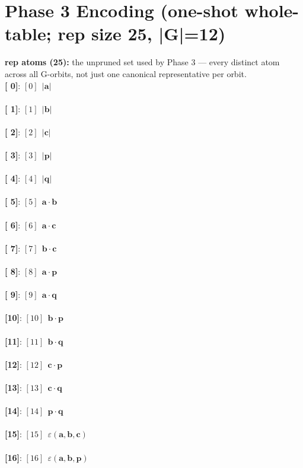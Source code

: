 \documentclass[a4paper,11pt]{article}
\newcommand{\vc}[1]{\ensuremath{\mathbf{#1}}}
\newcommand{\dnfagmiihhiejm}[1]{|\vc{#1}|}
\newcommand{\pdcegfomjfhook}[2]{\mathbf{#1} \cdot \mathbf{#2}}
\newcommand{\kblbmcpggoncpf}[3]{\varepsilon(\mathbf{#1},\mathbf{#2},\mathbf{#3})}
\begin{document}
\section{Phase 3 Encoding  (one-shot whole-table; rep size 25, |G|=12)}
\textbf{rep atoms (25):} the unpruned set used by Phase 3 — every distinct atom across all G-orbits, not just one canonical representative per orbit.\\
\textbf{    [ 0]}: $[0]\ \ \dnfagmiihhiejm{a}$\\\\
\textbf{    [ 1]}: $[1]\ \ \dnfagmiihhiejm{b}$\\\\
\textbf{    [ 2]}: $[2]\ \ \dnfagmiihhiejm{c}$\\\\
\textbf{    [ 3]}: $[3]\ \ \dnfagmiihhiejm{p}$\\\\
\textbf{    [ 4]}: $[4]\ \ \dnfagmiihhiejm{q}$\\\\
\textbf{    [ 5]}: $[5]\ \ \pdcegfomjfhook{a}{b}$\\\\
\textbf{    [ 6]}: $[6]\ \ \pdcegfomjfhook{a}{c}$\\\\
\textbf{    [ 7]}: $[7]\ \ \pdcegfomjfhook{b}{c}$\\\\
\textbf{    [ 8]}: $[8]\ \ \pdcegfomjfhook{a}{p}$\\\\
\textbf{    [ 9]}: $[9]\ \ \pdcegfomjfhook{a}{q}$\\\\
\textbf{    [10]}: $[10]\ \ \pdcegfomjfhook{b}{p}$\\\\
\textbf{    [11]}: $[11]\ \ \pdcegfomjfhook{b}{q}$\\\\
\textbf{    [12]}: $[12]\ \ \pdcegfomjfhook{c}{p}$\\\\
\textbf{    [13]}: $[13]\ \ \pdcegfomjfhook{c}{q}$\\\\
\textbf{    [14]}: $[14]\ \ \pdcegfomjfhook{p}{q}$\\\\
\textbf{    [15]}: $[15]\ \ \kblbmcpggoncpf{a}{b}{c}$\\\\
\textbf{    [16]}: $[16]\ \ \kblbmcpggoncpf{a}{b}{p}$\\\\
\end{document}
